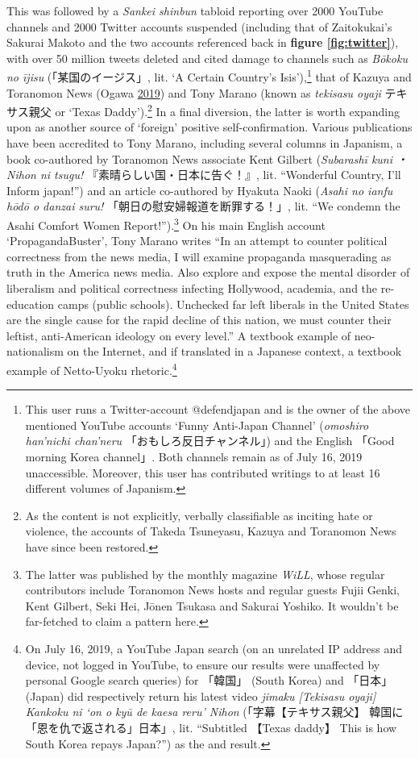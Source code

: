 \documentclass[10pt,british,A4paper,oneside]{memoir}
\begin{document}
This was followed by a \emph{Sankei shinbun} tabloid reporting over 2000
YouTube channels and 2000 Twitter accounts suspended (including that of
Zaitokukai's Sakurai Makoto and the two accounts referenced back in
\textbf{figure \ref{fig:twitter}}), with over 50 million tweets deleted
and cited damage to channels such as \emph{Bōkoku no ījisu}
(「某国のイージス」, lit. `A Certain Country's Isis'),\footnote{This
  user runs a Twitter-account @defendjapan and is the owner of the above
  mentioned YouTube accounts `Funny Anti-Japan Channel' (\emph{omoshiro
  han'nichi chan'neru} 「おもしろ反日チャンネル」) and the English
  「Good morning Korea channel」. Both channels remain as of July 16, 2019
  unaccessible. Moreover, this user has contributed writings to at least
  16 different volumes of Japanism.} that of Kazuya and Toranomon News
(Ogawa \protect\hyperlink{ref-ogawa_eng._2019}{2019}) and Tony Marano
(known as \emph{tekisasu oyaji} テキサス親父 or `Texas
Daddy').\footnote{As the content is not explicitly, verbally
  classifiable as inciting hate or violence, the accounts of Takeda
  Tsuneyasu, Kazuya and Toranomon News have since been restored.} In a
final diversion, the latter is worth expanding upon as another source of
`foreign' positive self-confirmation. Various publications have been
accredited to Tony Marano, including several columns in Japanism, a book
co-authored by Toranomon News associate Kent Gilbert (\emph{Subarashī
kuni ・ Nihon ni tsugu!} 『素晴らしい国・日本に告ぐ！』, lit.
``Wonderful Country, I'll Inform japan!'') and an article co-authored by
Hyakuta Naoki (\emph{Asahi no ianfu hōdō o danzai suru!}
「朝日の慰安婦報道を断罪する！」, lit. ``We condemn the Asahi Comfort
Women Report!'').\footnote{The latter was published by the monthly
  magazine \emph{WiLL}, whose regular contributors include Toranomon
  News hosts and regular guests Fujii Genki, Kent Gilbert, Seki Hei,
  Jōnen Tsukasa and Sakurai Yoshiko. It wouldn't be far-fetched to claim
  a pattern here.} On his main English account `PropagandaBuster', Tony
Marano writes ``In an attempt to counter political correctness from the
news media, I will examine propaganda masquerading as truth in the
America news media. Also explore and expose the mental disorder of
liberalism and political correctness infecting Hollywood, academia, and
the re-education camps (public schools). Unchecked far left liberals in
the United States are the single cause for the rapid decline of this
nation, we must counter their leftist, anti-American ideology on every
level.'' A textbook example of neo-nationalism on the Internet, and if
translated in a Japanese context, a textbook example of
Netto-Uyoku rhetoric.\footnote{On July 16, 2019, a YouTube Japan search (on an
  unrelated IP address and device, not logged in YouTube, to ensure our
  results were unaffected by personal Google search queries) for
  「韓国」 (South Korea) and 「日本」 (Japan) did respectively return
  his latest video \emph{jimaku {[}Tekisasu oyaji{]} Kankoku ni `on o
  kyū de kaesa reru' Nihon} (「字幕【テキサス親父】
  韓国に「恩を仇で返される」日本」, lit. ``Subtitled 【Texas daddy】
  This is how South Korea repays Japan?'') as the  and 
  result.}
\end{document}
